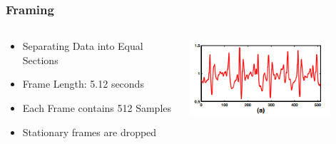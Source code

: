 \documentclass{beamer}
\begin{document}
\begin{frame}
  \frametitle{Framing}
  \begin{columns}
  \begin{column}{0.65\textwidth}
  	\begin{itemize}
  		\item Separating Data into Equal Sections    
  		\linebreak
  		\item Frame Length: 5.12 seconds       
  		\linebreak
  		\item Each Frame contains 512 Samples
  		\linebreak
  		\item Stationary frames are dropped                
  	\end{itemize}
  \end{column}
  \begin{column}{0.6\textwidth}
   \includegraphics[width=0.8\textwidth]{Illustrations/Framing.png}
       \\
  \end{column}
  
  \end{columns}
\end{frame}
\end{document}
